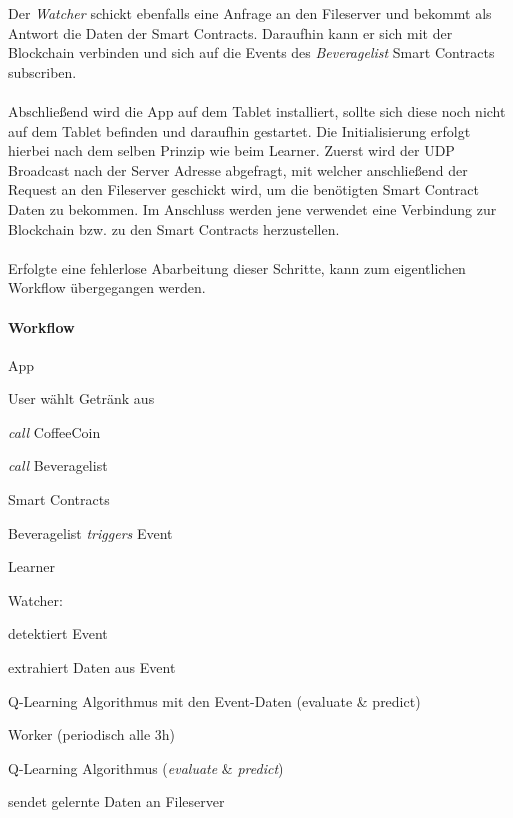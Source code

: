 Der \textit{Watcher} schickt ebenfalls eine Anfrage an den Fileserver und bekommt als Antwort die Daten der Smart Contracts. Daraufhin kann er sich mit der Blockchain verbinden und sich auf die Events des \textit{Beveragelist} Smart Contracts subscriben.\\\\
Abschließend wird die App auf dem Tablet installiert, sollte sich diese noch nicht auf dem Tablet befinden und daraufhin gestartet. Die Initialisierung erfolgt hierbei nach dem selben Prinzip wie beim Learner. Zuerst wird der UDP Broadcast nach der Server Adresse abgefragt, mit welcher anschließend der Request an den Fileserver geschickt wird, um die benötigten Smart Contract Daten zu bekommen. Im Anschluss werden jene verwendet eine Verbindung zur Blockchain bzw. zu den Smart Contracts herzustellen.
\\\\
Erfolgte eine fehlerlose Abarbeitung dieser Schritte, kann zum eigentlichen Workflow übergegangen werden.
\clearpage
\paragraph{Workflow}
\begin{legal}
	\item {App}
	\begin{legal}
		\item User wählt Getränk aus
		\item \textit{call} CoffeeCoin
		\item \textit{call} Beveragelist
	\end{legal}
				      	       	                            
	\item Smart Contracts
	\begin{legal}
		\item Beveragelist \textit{triggers} Event
	\end{legal}
				      	       	                              
	\item Learner
	\begin{legal}
		\item Watcher:
		\begin{legal}
			\item detektiert Event
			\item extrahiert Daten aus Event
			\item {} Q-Learning Algorithmus mit den Event-Daten (evaluate \& predict)
		\end{legal}
		\item Worker (periodisch alle 3h)
		\begin{legal}
			\item {} Q-Learning Algorithmus (\textit{evaluate} \& \textit{predict})
			\item sendet gelernte Daten an Fileserver
		\end{legal}
	\end{legal}
\end{legal}

